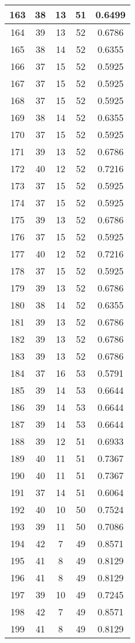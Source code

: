 \documentclass[letterpaper, 12pt]{article}
\begin{document}
\begin{longtable}{|c|c|c|c|c|}
\hline
163 & 38 & 13 & 51 & 0.6499 \\
\hline
164 & 39 & 13 & 52 & 0.6786 \\
\hline
165 & 38 & 14 & 52 & 0.6355 \\
\hline
166 & 37 & 15 & 52 & 0.5925 \\
\hline
167 & 37 & 15 & 52 & 0.5925 \\
\hline
168 & 37 & 15 & 52 & 0.5925 \\
\hline
169 & 38 & 14 & 52 & 0.6355 \\
\hline
170 & 37 & 15 & 52 & 0.5925 \\
\hline
171 & 39 & 13 & 52 & 0.6786 \\
\hline
172 & 40 & 12 & 52 & 0.7216 \\
\hline
173 & 37 & 15 & 52 & 0.5925 \\
\hline
174 & 37 & 15 & 52 & 0.5925 \\
\hline
175 & 39 & 13 & 52 & 0.6786 \\
\hline
176 & 37 & 15 & 52 & 0.5925 \\
\hline
177 & 40 & 12 & 52 & 0.7216 \\
\hline
178 & 37 & 15 & 52 & 0.5925 \\
\hline
179 & 39 & 13 & 52 & 0.6786 \\
\hline
180 & 38 & 14 & 52 & 0.6355 \\
\hline
181 & 39 & 13 & 52 & 0.6786 \\
\hline
182 & 39 & 13 & 52 & 0.6786 \\
\hline
183 & 39 & 13 & 52 & 0.6786 \\
\hline
184 & 37 & 16 & 53 & 0.5791 \\
\hline
185 & 39 & 14 & 53 & 0.6644 \\
\hline
186 & 39 & 14 & 53 & 0.6644 \\
\hline
187 & 39 & 14 & 53 & 0.6644 \\
\hline
188 & 39 & 12 & 51 & 0.6933 \\
\hline
189 & 40 & 11 & 51 & 0.7367 \\
\hline
190 & 40 & 11 & 51 & 0.7367 \\
\hline
191 & 37 & 14 & 51 & 0.6064 \\
\hline
192 & 40 & 10 & 50 & 0.7524 \\
\hline
193 & 39 & 11 & 50 & 0.7086 \\
\hline
194 & 42 & 7 & 49 & 0.8571 \\
\hline
195 & 41 & 8 & 49 & 0.8129 \\
\hline
196 & 41 & 8 & 49 & 0.8129 \\
\hline
197 & 39 & 10 & 49 & 0.7245 \\
\hline
198 & 42 & 7 & 49 & 0.8571 \\
\hline
199 & 41 & 8 & 49 & 0.8129 \\
\hline
\end{longtable}
\end{document}
